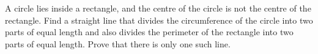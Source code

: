 A circle lies inside a rectangle, and the centre of the circle is not the centre of the rectangle. Find a straight line that divides the circumference of the circle into two parts of equal length and also divides the perimeter of the rectangle into two parts of equal length. Prove that there is only one such line.
